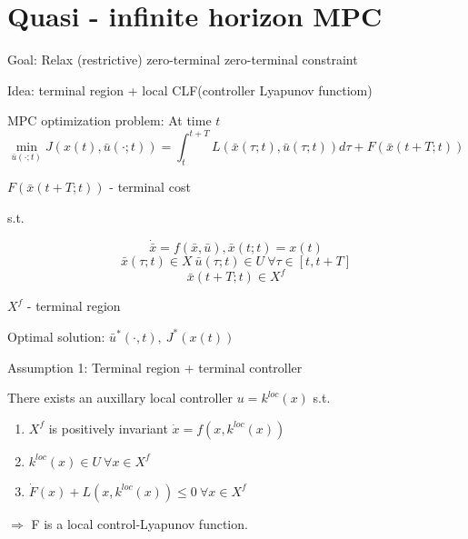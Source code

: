 \section{Quasi - infinite horizon MPC}

Goal: Relax (restrictive) zero-terminal zero-terminal constraint

Idea: terminal region + local CLF(controller Lyapunov functiom)

MPC optimization problem: At time $t$
\begin{equation*}
\min_{\bar u(\cdot;t)} J(x(t),\bar u(\cdot;t)) = \int_t^{t+T}L(\bar x(\tau;t), \bar u(\tau;t))d\tau + F(\bar x(t+T;t)) 
\end{equation*}

$F(\bar x(t+T;t))$ - terminal cost

s.t.

\begin{equation*}
\dot{\bar x} = f(\bar x, \bar u), \bar x(t;t) = x(t)
\end{equation*}
\begin{equation*}
\bar x(\tau;t) \in X \ \bar u(\tau;t) \in U \ \forall \tau \in [t,t+T]
\end{equation*}
\begin{equation*}
\bar x(t+T;t) \in X^f
\end{equation*}

$X^f$ - terminal region

Optimal solution: $\bar u^*(\cdot, t), \ J^*(x(t))$

Assumption 1: Terminal region + terminal controller

There exists an auxillary local controller $u = k^{loc}(x)$ s.t.
\begin{enumerate}
\item $X^f$ is positively invariant $\dot x = f(x,k^{loc}(x))$
\item $k^{loc}(x) \in U \ \forall x \in X^f$
\item $\dot F(x) + L(x, k^{loc}(x)) \leq 0 \ \forall x \in X^f$
\end{enumerate}

$\Rightarrow$ F is a local control-Lyapunov function.

